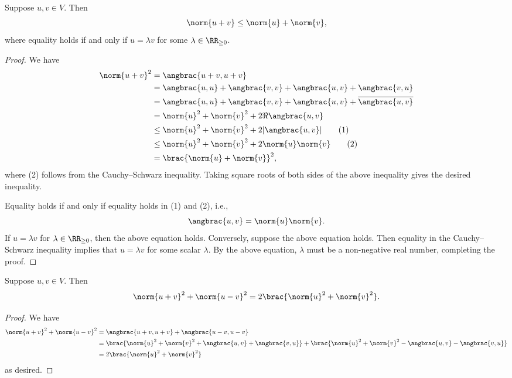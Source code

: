 \begin{lemma}
Suppose $u,v\in V$. Then
\begin{equation}
\norm{u+v}\le\norm{u}+\norm{v},
\end{equation}
where equality holds if and only if $u=\lambda v$ for some $\lambda\in\RR_{\ge0}$.
\end{lemma}

\begin{proof}
We have
\begin{align*}
\norm{u+v}^2
&=\angbrac{u+v,u+v}\\
&=\angbrac{u,u}+\angbrac{v,v}+\angbrac{u,v}+\angbrac{v,u}\\
&=\angbrac{u,u}+\angbrac{v,v}+\angbrac{u,v}+\overline{\angbrac{u,v}}\\
&=\norm{u}^2+\norm{v}^2+2\Re\angbrac{u,v}\\
&\le\norm{u}^2+\norm{v}^2+2|\angbrac{u,v}|\tag{1}\\
&\le\norm{u}^2+\norm{v}^2+2\norm{u}\norm{v}\tag{2}\\
&=\brac{\norm{u}+\norm{v}}^2,
\end{align*}
where (2) follows from the Cauchy--Schwarz inequality. Taking square roots of both sides of the above inequality gives the desired inequality.

Equality holds if and only if equality holds in (1) and (2), i.e.,
\[\angbrac{u,v}=\norm{u}\norm{v}.\]
If $u=\lambda v$ for $\lambda\in\RR_{\ge0}$, then the above equation holds. Conversely, suppose the above equation holds. Then equality in the Cauchy--Schwarz inequality implies that $u=\lambda v$ for some scalar $\lambda$. By the above equation, $\lambda$ must be a non-negative real number, completing the proof.
\end{proof}

\begin{corollary}

\end{corollary}

\begin{lemma}
Suppose $u,v\in V$. Then
\begin{equation}
\norm{u+v}^2+\norm{u-v}^2=2\brac{\norm{u}^2+\norm{v}^2}.
\end{equation}
\end{lemma}

\begin{proof}
We have
\begin{align*}
\norm{u+v}^2+\norm{u-v}^2
&=\angbrac{u+v,u+v}+\angbrac{u-v,u-v}\\
&=\brac{\norm{u}^2+\norm{v}^2+\angbrac{u,v}+\angbrac{v,u}}+\brac{\norm{u}^2+\norm{v}^2-\angbrac{u,v}-\angbrac{v,u}}\\
&=2\brac{\norm{u}^2+\norm{v}^2}
\end{align*}
as desired.
\end{proof}
\pagebreak

